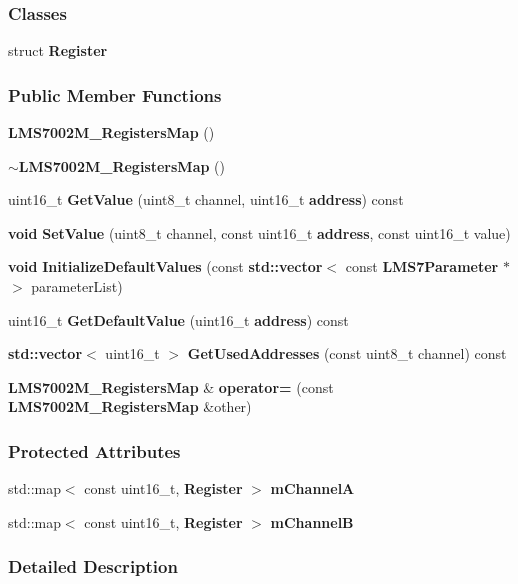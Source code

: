 \subsubsection*{Classes}
\begin{DoxyCompactItemize}
\item 
struct {\bf Register}
\end{DoxyCompactItemize}
\subsubsection*{Public Member Functions}
\begin{DoxyCompactItemize}
\item 
{\bf L\+M\+S7002\+M\+\_\+\+Registers\+Map} ()
\item 
{\bf $\sim$\+L\+M\+S7002\+M\+\_\+\+Registers\+Map} ()
\item 
uint16\+\_\+t {\bf Get\+Value} (uint8\+\_\+t channel, uint16\+\_\+t {\bf address}) const 
\item 
{\bf void} {\bf Set\+Value} (uint8\+\_\+t channel, const uint16\+\_\+t {\bf address}, const uint16\+\_\+t value)
\item 
{\bf void} {\bf Initialize\+Default\+Values} (const {\bf std\+::vector}$<$ const {\bf L\+M\+S7\+Parameter} $\ast$ $>$ parameter\+List)
\item 
uint16\+\_\+t {\bf Get\+Default\+Value} (uint16\+\_\+t {\bf address}) const 
\item 
{\bf std\+::vector}$<$ uint16\+\_\+t $>$ {\bf Get\+Used\+Addresses} (const uint8\+\_\+t channel) const 
\item 
{\bf L\+M\+S7002\+M\+\_\+\+Registers\+Map} \& {\bf operator=} (const {\bf L\+M\+S7002\+M\+\_\+\+Registers\+Map} \&other)
\end{DoxyCompactItemize}
\subsubsection*{Protected Attributes}
\begin{DoxyCompactItemize}
\item 
std\+::map$<$ const uint16\+\_\+t, {\bf Register} $>$ {\bf m\+ChannelA}
\item 
std\+::map$<$ const uint16\+\_\+t, {\bf Register} $>$ {\bf m\+ChannelB}
\end{DoxyCompactItemize}


\subsubsection{Detailed Description}


